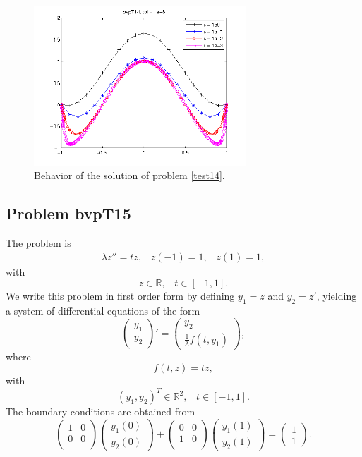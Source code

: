 \documentclass[<options>]{article}
\def \RR {{\mathbb{R}}}
\begin{document}
\begin{figure}[htb]
\centerline{\includegraphics[height=6cm]{Prob14}}
\caption{Behavior of the solution of problem \ref{test14}.}
\end{figure}
\newpage
\subsection{Problem bvpT15}\label{test15}
The problem is 
\begin{eqnarray*}
\lambda z'' = t z, \;\;\;z(-1) = 1, \;\;\; z(1) = 1,
\end{eqnarray*}
with
\[
z \in \RR, \;\;\; t\in [-1,1].
\]
We write this problem in first order form by defining $y_1=z$ and $y_2=z'$, yielding a system of differential equations of the form
\begin{equation*}
\left(\begin{array}{c}
y_1\\
y_2
\end{array}\right)'=
\left(\begin{array}{c}
y_2\\
\frac{1}{\lambda}f(t,y_1)
\end{array}\right),
\end{equation*}
where
\begin{equation*}
 f(t,z) = t z,
\end{equation*}
with
\[
(y_1,y_2)^T \in \RR^{2}, \;\;\;  t \in [-1,1].
\]
The  boundary conditions are obtained from
\begin{equation*}
\left(
  \begin{array}{cc}
    1 & 0 \\
    0 & 0 \\
  \end{array}
\right)
\left(\begin{array}{c}
y_{1}(0)\\
y_{2}(0)
\end{array}\right)
+
\left(
  \begin{array}{cc}
    0 & 0 \\
    1 & 0 \\
  \end{array}
\right)
\left(\begin{array}{c}
y_{1}(1)\\
y_{2}(1)
\end{array}\right)=\left(\begin{array}{c}
1 \\
1
\end{array}\right).
\end{equation*}
\end{document}
